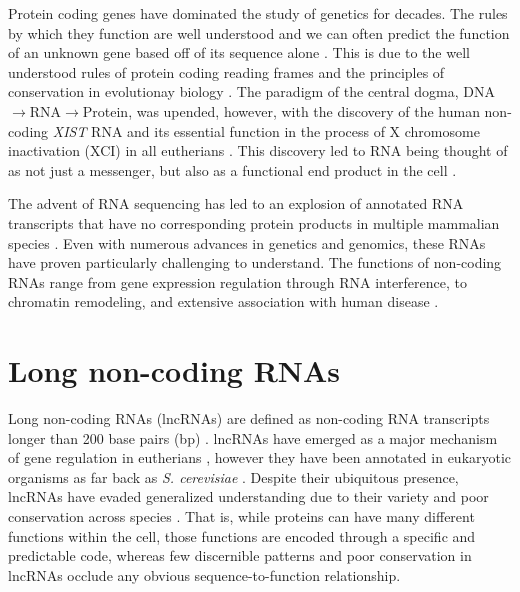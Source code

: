 Protein coding genes have dominated the study of genetics for decades. The rules by which they function are well understood and we can often predict the function of an unknown gene based off of its sequence alone \cite{Whisstock2003PredictionStructure}. This is due to the well understood rules of protein coding reading frames and the principles of conservation in evolutionay biology \cite{Burge1997PredictionDNA,Altschul1990BasicTool,Wheeler2013Nhmmer:HMMs}. The paradigm of the central dogma, DNA $\rightarrow$RNA$\rightarrow$Protein, was upended, however, with the discovery of the human non-coding \emph{XIST} RNA  and its essential function in the process of X chromosome inactivation (XCI) in all eutherians \cite{Brown10TheNucleus.,Brockdorff10TheNucleus.}. This discovery led to RNA being thought of as not just a messenger, but also as a functional end product in the cell \cite{Rinn2012GenomeRNAs,Lee2003TheProcessing,Yang2013MALAT-1Regulation,Tripathi2010ThePhosphorylation,Raphael2017IntegratedAdenocarcinoma,Brown10TheNucleus.,Brockdorff10TheNucleus.}. 

The advent of RNA sequencing has led to an explosion of annotated RNA transcripts that have no corresponding protein products in multiple mammalian species \cite{Derrien2012TheExpression,Hon2017AnEnds,Bogu2016ChromatinMouse}. Even with numerous advances in genetics and genomics, these RNAs have proven particularly challenging to understand. The functions of non-coding RNAs range from gene expression regulation through RNA interference, to chromatin remodeling, and extensive association with human disease \cite{Rinn2012GenomeRNAs,Lee2003TheProcessing,Yang2013MALAT-1Regulation,Tripathi2010ThePhosphorylation,Raphael2017IntegratedAdenocarcinoma,}.
\section{Long non-coding RNAs}
Long non-coding RNAs (lncRNAs) are defined as non-coding RNA transcripts longer than 200 base pairs (bp) \cite{Derrien2012TheExpression}. lncRNAs have emerged as a major mechanism of gene regulation in eutherians \cite{Sarropoulos2019DevelopmentalSpecies,Bogu2016ChromatinMouse,Sauvageau2013MultipleDevelopment}, however they have been annotated in eukaryotic organisms as far back as \emph{S. cerevisiae} \cite{Niederer2017LongCerevisiae}. Despite their ubiquitous presence, lncRNAs have evaded generalized understanding due to their variety and poor conservation across species \cite{Johnsson2014EvolutionaryFunction}. That is, while proteins can have many different functions within the cell, those functions are encoded through a specific and predictable code, whereas few discernible patterns and poor conservation in lncRNAs occlude any obvious sequence-to-function relationship.



